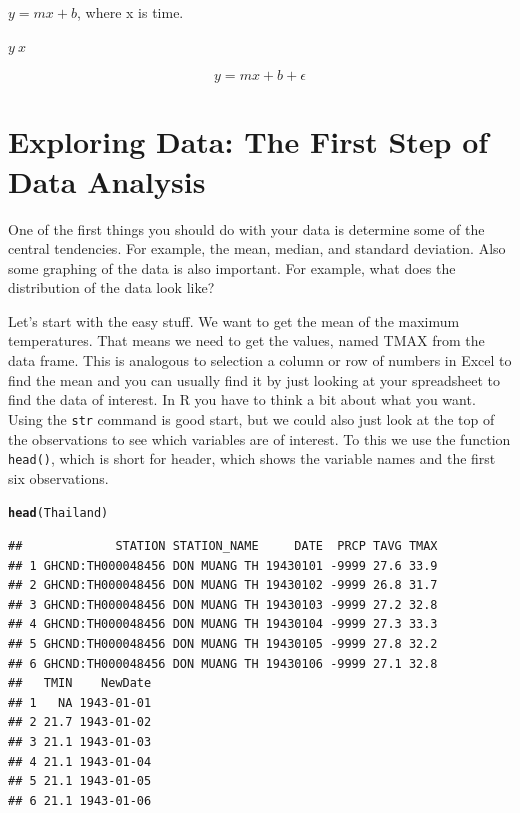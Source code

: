 \documentclass{article}\usepackage[]{graphicx}\usepackage[]{color}
\makeatletter
\newcommand{\hlstd}[1]{\textcolor[rgb]{0.345,0.345,0.345}{#1}}%
\newcommand{\hlkwd}[1]{\textcolor[rgb]{0.737,0.353,0.396}{\textbf{#1}}}%
\newenvironment{kframe}{%
 \def\at@end@of@kframe{}%
 \ifinner\ifhmode%
  \def\at@end@of@kframe{\end{minipage}}%
  \begin{minipage}{\columnwidth}%
 \fi\fi%
 \def\FrameCommand##1{\hskip\@totalleftmargin \hskip-\fboxsep
 \colorbox{shadecolor}{##1}\hskip-\fboxsep
     \hskip-\linewidth \hskip-\@totalleftmargin \hskip\columnwidth}%
 \MakeFramed {\advance\hsize-\width
   \@totalleftmargin\z@ \linewidth\hsize
   \@setminipage}}%
 {\par\unskip\endMakeFramed%
 \at@end@of@kframe}
\newenvironment{knitrout}{}{} %
\makeatother
\begin{document}
$y =mx +b$, where x is time. 

$y ~ x$

\begin{equation}
y = mx + b + \epsilon
\end{equation}

\section{Exploring Data: The First Step of Data Analysis}

One of the first things you should do with your data is determine some of the central tendencies. For example, the mean, median, and standard deviation. Also some graphing of the data is also important. For example, what does the distribution of the data look like?

Let's start with the easy stuff. We want to get the mean of the maximum temperatures. That means we need to get the values, named TMAX from the data frame. This is analogous to selection a column or row of numbers in Excel to find the mean and you can usually find it by just looking at your spreadsheet to find the data of interest. In R you have to think a bit about what you want. Using the \texttt{str} command is good start, but we could also just look at the top of the observations to see which variables are of interest. To this we use the function \texttt{head()}, which is short for header, which shows the variable names and the first six observations.

\begin{knitrout}
\color{fgcolor}\begin{kframe}
\begin{alltt}
\hlkwd{head}\hlstd{(Thailand)}
\end{alltt}
\begin{verbatim}
##             STATION STATION_NAME     DATE  PRCP TAVG TMAX
## 1 GHCND:TH000048456 DON MUANG TH 19430101 -9999 27.6 33.9
## 2 GHCND:TH000048456 DON MUANG TH 19430102 -9999 26.8 31.7
## 3 GHCND:TH000048456 DON MUANG TH 19430103 -9999 27.2 32.8
## 4 GHCND:TH000048456 DON MUANG TH 19430104 -9999 27.3 33.3
## 5 GHCND:TH000048456 DON MUANG TH 19430105 -9999 27.8 32.2
## 6 GHCND:TH000048456 DON MUANG TH 19430106 -9999 27.1 32.8
##   TMIN    NewDate
## 1   NA 1943-01-01
## 2 21.7 1943-01-02
## 3 21.1 1943-01-03
## 4 21.1 1943-01-04
## 5 21.1 1943-01-05
## 6 21.1 1943-01-06
\end{verbatim}
\end{kframe}
\end{knitrout}
\end{document}
